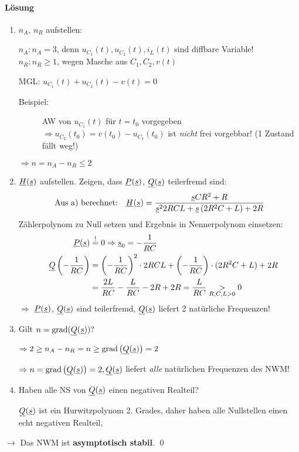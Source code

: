 \paragraph{Lösung}
\begin{enumerate}[label=\arabic{*})]

  \item $n_A$, $n_R$ aufstellen:\par
  $n_A\colon n_A=3$, denn $u_{C_1}(t), u_{C_2}(t), i_L(t)$
    sind diffbare Variable!\\
  $n_R\colon n_R\geq 1$, wegen Masche aus $C_1, C_2, v(t)$%

  \acs{MGL}: $u_{C_1}(t) + u_{C_2}(t) - v(t) = 0$
  \begin{description}
    \item[Beispiel:] AW von $u_{C_1}(t)$ für $t = t_0$ vorgegeben\\
      $\Rightarrow u_{C_2}(t_0) = v(t_0) - u_{C_1}(t_0)$
      ist \emph{nicht} frei vorgebbar! (1 Zustand fällt weg!)
  \end{description}
  $\Rightarrow n = n_A- n_R \leq 2$

  \item $\underline{H}(\underline{s})$ aufstellen. Zeigen, dass $\underline{P}(\underline{s})$, $\underline{Q}(\underline{s})$
    teilerfremd sind:
    \[\text{Aus a) berechnet:}\quad
      \underline{H}(\underline{s}) = \frac{\underline{s}CR^2+R}{\underline{s}^2 2RCL+\underline{s}\left(2R^2C+L\right)+2R}\]
    Zählerpolynom zu Null setzen und Ergebnis in Nennerpolynom einsetzen:
    \begin{align*}
      \cn{P}(\cn s) &\stackrel{!}{=} 0 \Rightarrow \cn s_0 = -\frac{1}{RC}\\
      \quad\cn{Q}\left(-\frac{1}{RC}\right)%
      &= \left(-\frac{1}{RC}\right)^2\cdot 2RCL +
        \left(-\frac{1}{RC}\right)\cdot (2R^2C+L) + 2R\\
      &= \frac{2L}{RC} - \frac{L}{RC} - 2R+2R
        = \frac{L}{RC} \underset{R,C,L > 0}{>} 0
    \end{align*}
    $\Rightarrow$ $\underline{P}(\underline{s})$, $\underline{Q}(\underline{s})$ sind teilerfremd,
    $\underline{Q}(\underline{s})$ liefert 2 natürliche Frequenzen!


  \item Gilt $n=\operatorname{grad}(\underline{Q}(\underline{s}))?$\par
    $\Rightarrow 2\geq n_A - n_R = n \geq \operatorname{grad}\left(\underline{Q}(\underline{s})\right) = 2$

    $\Rightarrow n = \operatorname{grad}\left(\underline{Q}(\underline{s})\right) = 2, \underline{Q}(\underline{s})$
    liefert \emph{alle} natürlichen Frequenzen des NWM!

  \item Haben alle NS von $\underline{Q}(\underline{s})$ einen negativen Realteil?\par
    $\underline{Q}(\underline{s})$ ist ein Hurwitzpolynom 2. Grades,
    daher haben alle Nullstellen einen echt negativen Realteil,
\end{enumerate}
$\rightarrow$ Das NWM ist \textbf{asymptotisch stabil}. \qed
